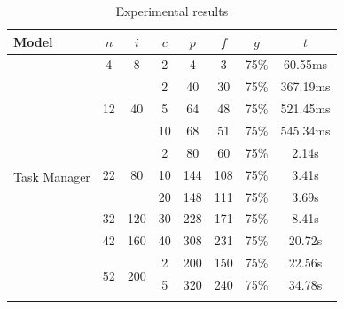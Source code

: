 \begin{table}[H]
  \caption{Experimental results}
    \label{tab:res}
  \begin{center}
\begin{tabular}{| l || c | c | c | c | c | c | c |}
    \hline
    Model                              & $n$                      & $i$                    & $c$          & $p$   & $f$   & $g$    & $t$   \\ \hline \hline                                  
    \multirow{14}{*}{Task Manager}     & 4                        & 8                      & 2            & 4     & 3     &  75\%  & 60.55ms \\ \cline{2-7}
                                       & \multirow{3}{*}{12}      & \multirow{3}{*}{40}    & 2            & 40    & 30    &  75\%  & 367.19ms \\ \cline{4-7}
                                       &                          &                        & 5            & 64    & 48    &  75\%  & 521.45ms \\ \cline{4-7}
                                       &                          &                        & 10           & 68    & 51    &  75\%  & 545.34ms \\ \cline{2-7}
                                       & \multirow{3}{*}{22}      & \multirow{3}{*}{80}    & 2            & 80    & 60    &  75\%  & 2.14s \\ \cline{4-7}
                                       &                          &                        & 10           & 144   & 108   &  75\%  & 3.41s \\ \cline{4-7}
                                       &                          &                        & 20           & 148   & 111   &  75\%  & 3.69s \\ \cline{2-7}
                                       & 32                       & 120                    & 30           & 228   & 171   &  75\%  & 8.41s \\ \cline{2-7}
                                       & 42                       & 160                    & 40           & 308   & 231   &  75\%  & 20.72s \\ \cline{2-7}
                                       & \multirow{6}{*}{52}      & \multirow{6}{*}{200}   & 2            & 200   & 150   &  75\%  & 22.56s \\ \cline{4-7}
                                       &                          &                        & 5            & 320   & 240   &  75\%  & 34.78s \\ \cline{4-7}

\end{tabular}
\end{center}
\end{table}
